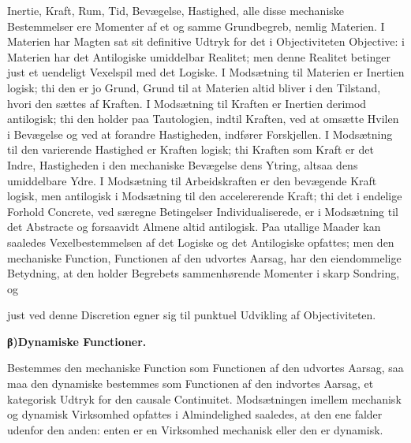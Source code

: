 \documentclass[12pt]{book}
\newcommand{\opage}[1]{\marginnote{\footnotesize\textit{[#1]}}}
\begin{document}
Inertie, Kraft, Rum, Tid, Bevægelse, Hastighed, alle disse mechaniske Bestemmelser ere
Momenter af et og samme Grundbegreb, nemlig Materien. I Materien har Magten sat sit
definitive Udtryk for det i Objectiviteten Objective: i Materien har det Antilogiske
umiddelbar Realitet; men denne Realitet betinger just et uendeligt Vexelspil med det
Logiske. I Modsætning til Materien er Inertien logisk; thi den er jo Grund, Grund til at
Materien altid bliver i den Tilstand, hvori den sættes af Kraften. I Modsætning til Kraften
er Inertien derimod antilogisk; thi den holder paa Tautologien, indtil Kraften, ved at
omsætte Hvilen i Bevægelse og ved at forandre Hastigheden, indfører Forskjellen. I
Modsætning til den varierende Hastighed er Kraften logisk; thi Kraften som Kraft er det
Indre, Hastigheden i den mechaniske Bevægelse dens Ytring, altsaa dens umiddelbare Ydre. I
Modsætning til Arbeidskraften er den bevægende Kraft logisk, men antilogisk i Modsætning
til den accelererende Kraft; thi det i endelige Forhold Concrete, ved særegne Betingelser
Individualiserede, er i Modsætning til det Abstracte og forsaavidt Almene altid antilogisk.
Paa utallige Maader kan saaledes Vexelbestemmelsen af det Logiske og det Antilogiske
opfattes; men den mechaniske Function, Functionen af den udvortes Aarsag, har den
eiendommelige Betydning, at den holder Begrebets sammenhørende Momenter i skarp Sondring,
og

\opage{354} just ved denne Discretion egner sig til punktuel Udvikling af Objectiviteten.

\begin{center}{\bfseries β)\quad Dynamiske Functioner.}\end{center}

Bestemmes den mechaniske Function som Functionen af den udvortes Aarsag, saa maa den
dynamiske bestemmes som Functionen af den indvortes Aarsag, et kategorisk Udtryk for den
causale Continuitet. Modsætningen imellem mechanisk og dynamisk Virksomhed opfattes i
Almindelighed saaledes, at den ene falder udenfor den anden: enten er en Virksomhed
mechanisk eller den er dynamisk.
\end{document}
